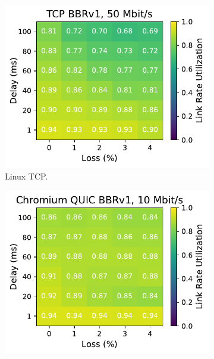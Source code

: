 \begin{figure}[ht]
\begin{subfigure}[b]{0.22\linewidth}
        \includegraphics[width=\linewidth,trim={0 0 2cm 0},clip]{splitting/figures/heatmaps/heatmap_tcp_bbr1_50mbps.pdf}
        \caption{Linux TCP.}
    \end{subfigure}
    \begin{subfigure}[b]{0.22\linewidth}
        \includegraphics[width=\linewidth,trim={0 0 2cm 0},clip]{splitting/figures/heatmaps/heatmap_quic_bbr1_10mbps.pdf}

\end{subfigure}
\end{figure}
